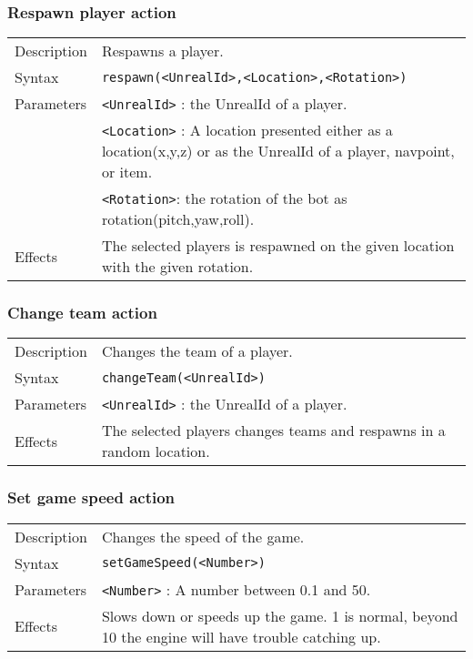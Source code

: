 \documentclass[11pt,a4paper]{article}
\begin{document}
\subsubsection*{Respawn player  action}

\begin{small}
\begin{tabular}{p{2cm}p{9cm}}
Description & Respawns a player. \\
Syntax & \verb|respawn(<UnrealId>,<Location>,<Rotation>)|\\
Parameters 	& \verb|<UnrealId>| : the UnrealId of a player. \\
		& \verb|<Location>| : A location presented either as a location(x,y,z) or as the UnrealId of a player, navpoint, or item. \\
		& \verb|<Rotation>|: the rotation of the bot as rotation(pitch,yaw,roll).\\
Effects &	The selected players is respawned on the given location with the given rotation. \\
\end{tabular}
\end{small}

\subsubsection*{Change team action}

\begin{small}
\begin{tabular}{p{2cm}p{9cm}}
Description & Changes the team of a player. \\
Syntax & \verb|changeTeam(<UnrealId>)|\\
Parameters 	& \verb|<UnrealId>| : the UnrealId of a player. \\
Effects &	The selected players changes teams and respawns in a random location. \\
\end{tabular}
\end{small}

\subsubsection*{Set game speed action}

\begin{small}
\begin{tabular}{p{2cm}p{9cm}}
Description & Changes the speed of the game. \\
Syntax & \verb|setGameSpeed(<Number>)|\\
Parameters 	& \verb|<Number>| : A number between 0.1 and 50. \\
Effects &	Slows down or speeds up the game. 1 is normal, beyond 10 the engine will have trouble catching up. \\
\end{tabular}
\end{small}
\end{document}
